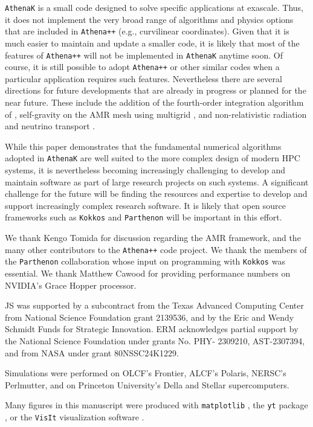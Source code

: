 \documentclass[twocolumn, floatfix]{aastex63}
\newcommand{\app}{\texttt{Athena++}}
\newcommand{\ak}{\texttt{AthenaK}}
\newcommand{\kokkos}{\texttt{Kokkos}}
\newcommand{\parth}{\texttt{Parthenon}}
\begin{document}
\ak{} is a small code designed to solve specific applications at exascale.  Thus, it does not implement the very broad range of algorithms and physics options that are included in \app{} (e.g., curvilinear coordinates). Given that it is much easier to maintain and update a smaller code, it is likely that most of the features of \app{} will not be implemented in \ak{} anytime soon.  Of course, it is still possible to adopt \app{} or other similar codes when a particular application requires such features.  Nevertheless there are several directions for future developments that are already in progress or planned for the near future.  These include the addition of the fourth-order integration algorithm of \cite{felker2018JCoPh.375.1365F}, self-gravity on the AMR mesh using multigrid \citep{tomida2023ApJS..266....7T}, and non-relativistic radiation and neutrino transport \citep{jiang2012ApJS..199...14J}.

While this paper demonstrates that the fundamental numerical algorithms adopted in \ak{} are well suited to the more complex design of modern HPC systems, it is nevertheless becoming increasingly challenging to develop and maintain software as part of large research projects on such systems. A significant challenge for the future will be finding the resources and expertise to develop and support increasingly complex research software.  It is likely that open source frameworks such as \kokkos{} and \parth{} will be important in this effort.

\acknowledgments

We thank Kengo Tomida for discussion regarding the AMR framework, and the many other contributors to the \app{} code project. We thank the members of the \parth{} collaboration whose input on programming with \kokkos{} was essential.
We thank Matthew Cawood for providing performance numbers on NVIDIA's Grace Hopper processor. 

JS was supported by a subcontract from the Texas Advanced Computing Center from National Science Foundation grant 2139536, and by the Eric and Wendy Schmidt Funds for Strategic Innovation. 
ERM acknowledges partial support
by the National Science Foundation under grants No. PHY-
2309210, AST-2307394, and from NASA under grant 80NSSC24K1229.

Simulations were performed on OLCF's Frontier, ALCF's Polaris, NERSC's Perlmutter, and on Princeton University's Della and Stellar supercomputers.

Many figures in this manuscript were produced with \texttt{matplotlib} \citep{Hunter:2007}, the \texttt{yt} package \citep{2011ApJS..192....9T}, or the \texttt{VisIt} visualization software \citep{Childs_High_Performance_Visualization--Enabling_2012}.
\end{document}
